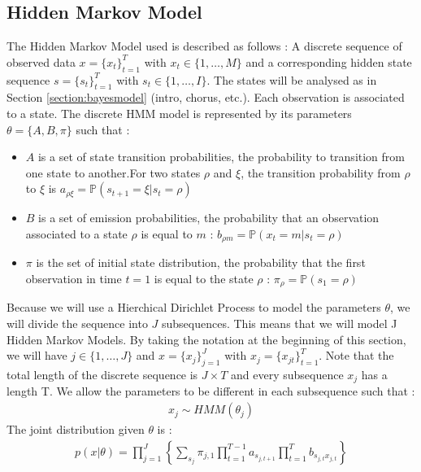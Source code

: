 \subsection{Hidden Markov Model}
The Hidden Markov Model used is described as follows : A discrete sequence of observed data $x=\{x_t\}^T_{t=1}$ with $x_t \in \{1,\dots, M \}$ and a corresponding hidden state sequence $s=\{s_t\}^T_{t=1}$ with $s_t \in \{ 1, \dots, I \}$. The states will be analysed as in Section \ref{section:bayesmodel} (intro, chorus, etc.). Each observation is associated to a state. The discrete HMM model is represented by its parameters $\theta=\{A,B,\pi\}$ such that : 
\begin{itemize}
	\item $A$ is a set of state transition probabilities, the probability to transition from one state to another.For two states $\rho$ and $\xi$, the transition probability from $\rho$ to $\xi$ is $a_{\rho\xi}=\mathbb P(s_{t+1}=\xi | s_t=\rho)$
	\item $B$ is a set of emission probabilities, the probability that an observation associated to a state $\rho$ is equal to $m$ : $b_{\rho m}=\mathbb P(x_t= m | s_t=\rho)$
	\item  $\pi$ is the set of initial state distribution, the probability that the first observation in time $t=1$ is equal to the state $\rho$ : $\pi_{\rho}=\mathbb P(s_1=\rho)$
\end{itemize}
Because we will use a Hierchical Dirichlet Process to model the parameters $\theta$, we will divide the sequence into $J$ subsequences. This means that we will model J Hidden Markov Models. By taking the notation at the beginning of this section, we will have $j\in \{1, \dots, J\}$ and $x=\{x_j\}_{j=1}^J$ with $x_j=\{ x_{jt}\}_{t=1}^T$. Note that the total length of the discrete sequence is $J\times T$ and every subsequence $x_j$ has a length T. We allow the parameters to be different in each subsequence such that : \begin{align*}
 		x_j \sim HMM(\theta_j)
 \end{align*}
The joint distribution given $\theta$ is : 
\begin{align*}
	p(x|\theta)=\prod^J_{j=1}\left\{ \sum_{s_j}\pi_{{j,1}}\prod^{T-1}_{t=1}a_{s_{j,t+1}} \prod^T_{t=1} b_{s_{j,t}x_{j,t}} \right\}
\end{align*}

